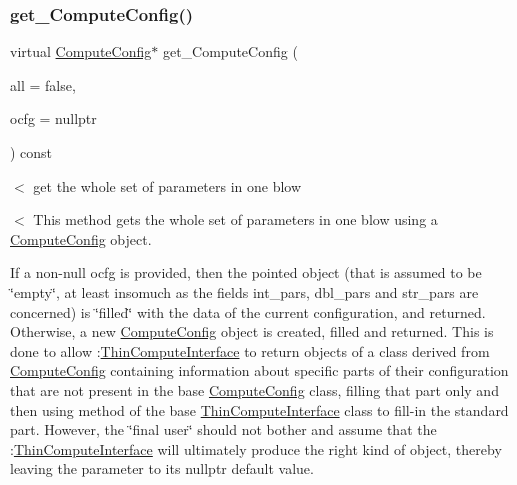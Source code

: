 \mbox{\label{class_s_m_spp__di__unipi__it_1_1_thin_compute_interface_adaa8da125823294995410c022a59a4b5}} 
\subsubsection{\texorpdfstring{get\+\_\+\+Compute\+Config()}{get\_ComputeConfig()}}
{\footnotesize\ttfamily virtual \mbox{\hyperlink{class_s_m_spp__di__unipi__it_1_1_compute_config}{Compute\+Config}}$\ast$ get\+\_\+\+Compute\+Config (\begin{DoxyParamCaption}\item[{bool}]{all = {\ttfamily false},  }\item[{\mbox{\hyperlink{class_s_m_spp__di__unipi__it_1_1_compute_config}{Compute\+Config}} $\ast$}]{ocfg = {\ttfamily nullptr} }\end{DoxyParamCaption}) const\hspace{0.3cm}{\ttfamily [virtual]}}



$<$ get the whole set of parameters in one blow 

$<$ This method gets the whole set of parameters in one blow using a \mbox{\hyperlink{class_s_m_spp__di__unipi__it_1_1_compute_config}{Compute\+Config}} object.

If a non-\/null ocfg is provided, then the pointed object (that is assumed to be \char`\"{}empty\char`\"{}, at least insomuch as the fields int\+\_\+pars, dbl\+\_\+pars and str\+\_\+pars are concerned) is \char`\"{}filled\char`\"{} with the data of the current configuration, and returned. Otherwise, a new \mbox{\hyperlink{class_s_m_spp__di__unipi__it_1_1_compute_config}{Compute\+Config}} object is created, filled and returned. This is done to allow \+:\mbox{\hyperlink{class_s_m_spp__di__unipi__it_1_1_thin_compute_interface}{Thin\+Compute\+Interface}} to return objects of a class derived from \mbox{\hyperlink{class_s_m_spp__di__unipi__it_1_1_compute_config}{Compute\+Config}} containing information about specific parts of their configuration that are not present in the base \mbox{\hyperlink{class_s_m_spp__di__unipi__it_1_1_compute_config}{Compute\+Config}} class, filling that part only and then using method of the base \mbox{\hyperlink{class_s_m_spp__di__unipi__it_1_1_thin_compute_interface}{Thin\+Compute\+Interface}} class to fill-\/in the standard part. However, the \char`\"{}final user\char`\"{} should not bother and assume that the \+:\mbox{\hyperlink{class_s_m_spp__di__unipi__it_1_1_thin_compute_interface}{Thin\+Compute\+Interface}} will ultimately produce the right kind of object, thereby leaving the parameter to its nullptr default value.


